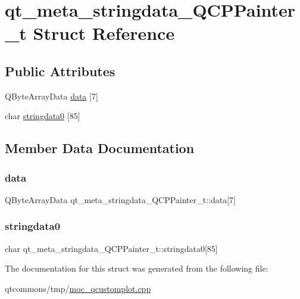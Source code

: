 \hypertarget{structqt__meta__stringdata___q_c_p_painter__t}{}\section{qt\+\_\+meta\+\_\+stringdata\+\_\+\+Q\+C\+P\+Painter\+\_\+t Struct Reference}
\label{structqt__meta__stringdata___q_c_p_painter__t}
\subsection*{Public Attributes}
\begin{DoxyCompactItemize}
\item 
Q\+Byte\+Array\+Data \mbox{\hyperlink{structqt__meta__stringdata___q_c_p_painter__t_ad207c5d12c2c25b489d92c783a387865}{data}} \mbox{[}7\mbox{]}
\item 
char \mbox{\hyperlink{structqt__meta__stringdata___q_c_p_painter__t_a5a729fecff22f5c3258902008085a51f}{stringdata0}} \mbox{[}85\mbox{]}
\end{DoxyCompactItemize}


\subsection{Member Data Documentation}
\mbox{\label{structqt__meta__stringdata___q_c_p_painter__t_ad207c5d12c2c25b489d92c783a387865}} 
\subsubsection{\texorpdfstring{data}{data}}
{\footnotesize\ttfamily Q\+Byte\+Array\+Data qt\+\_\+meta\+\_\+stringdata\+\_\+\+Q\+C\+P\+Painter\+\_\+t\+::data\mbox{[}7\mbox{]}}

\mbox{\label{structqt__meta__stringdata___q_c_p_painter__t_a5a729fecff22f5c3258902008085a51f}} 
\subsubsection{\texorpdfstring{stringdata0}{stringdata0}}
{\footnotesize\ttfamily char qt\+\_\+meta\+\_\+stringdata\+\_\+\+Q\+C\+P\+Painter\+\_\+t\+::stringdata0\mbox{[}85\mbox{]}}



The documentation for this struct was generated from the following file\+:\begin{DoxyCompactItemize}
\item 
qtcommons/tmp/\mbox{\hyperlink{moc__qcustomplot_8cpp}{moc\+\_\+qcustomplot.\+cpp}}\end{DoxyCompactItemize}
